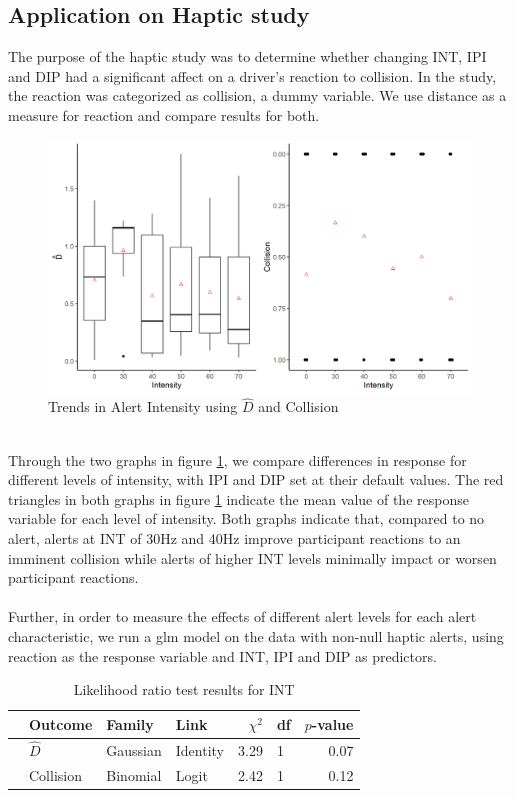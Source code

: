 \documentclass{article}
\begin{document}
\subsection{Application on Haptic study}
The purpose of the haptic study was to determine whether changing INT, IPI and DIP had a significant affect on a driver's reaction to collision. In the study, the reaction was categorized as collision, a dummy variable. We use distance as a measure for reaction and compare results for both.\\
\begin{figure}[h!]
\includegraphics[width = 12cm, height = 7 cm]{fig3.png}
\caption{Trends in Alert Intensity using $\hat{D}$ and Collision}
\label{figure 3}
\end{figure}\\
Through the two graphs in figure \ref{figure 3}, we compare differences in response for different levels of intensity, with IPI and DIP set at their default values. The red triangles in both graphs in figure \ref{figure 3} indicate the mean value of the response variable for each level of intensity. Both graphs indicate that, compared to no alert, alerts at INT of 30Hz and 40Hz improve participant reactions to an imminent collision while alerts of higher INT levels minimally impact or worsen participant reactions.\\\\ Further, in order to measure the effects of different alert levels for each alert characteristic, we run a glm model on the data with non-null haptic alerts, using reaction as the response variable and INT, IPI and DIP as predictors.\\
\begin{table}[ht]
\centering
\begin{tabular}{rlllrlr}
  \hline
 & Outcome & Family & Link & $\chi^2$ & df & $p$-value \\ 
  \hline
 & $\hat{D} $ & Gaussian & Identity & 3.29 & 1 & 0.07 \\ 
  & Collision & Binomial & Logit & 2.42 & 1 & 0.12 \\ 
   \hline
\end{tabular}
\caption{Likelihood ratio test results for INT}
\label{table 1}
\end{table}\\
\end{document}

